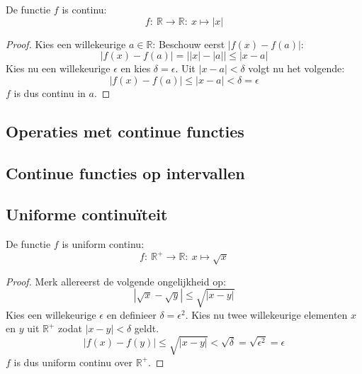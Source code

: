 \documentclass[main.tex]{subfiles}
\begin{document}

\begin{vb}
  De functie $f$ is continu:
  \[ f:\ \mathbb{R} \rightarrow \mathbb{R}:\ x \mapsto |x| \]

  \begin{proof}
    Kies een willekeurige $a\in \mathbb{R}$:
    Beschouw eerst $|f(x)-f(a)|$:
    \[ |f(x)-f(a)| = \left||x|-|a|\right| \le |x-a| \]
    Kies nu een willekeurige $\epsilon$ en kies $\delta = \epsilon$.
    Uit $|x-a| <\delta$ volgt nu het volgende:
    \[ |f(x)-f(a)| \le |x-a| < \delta = \epsilon \]
    $f$ is dus continu in $a$.
  \end{proof}
\end{vb}

\subsection{Operaties met continue functies}
\label{sec:oper-met-cont}



\subsection{Continue functies op intervallen}
\label{sec:continue-functies-op}


\subsection{Uniforme continu\"iteit}
\label{sec:unif-cont}


\begin{vb}
  De functie $f$ is uniform continu:
  \[ f:\ \mathbb{R}^{+} \rightarrow \mathbb{R}:\ x \mapsto \sqrt{x} \]

  \begin{proof}
    Merk allereerst de volgende ongelijkheid op:
    \[ |\sqrt{x} - \sqrt{y}| \le \sqrt{|x-y|} \]
    Kies een willekeurige $\epsilon$ en definieer $\delta = \epsilon^{2}$.
    Kies nu twee willekeurige elementen $x$ en $y$ uit $\mathbb{R}^{+}$ zodat $|x-y|< \delta$ geldt.
    \[ |f(x) - f(y)| \le  \sqrt{|x-y|} < \sqrt{\delta} = \sqrt{\epsilon^{2}} = \epsilon \]
    $f$ is dus uniform continu over $\mathbb{R}^{+}$.
  \end{proof}
\end{vb}
\end{document}
